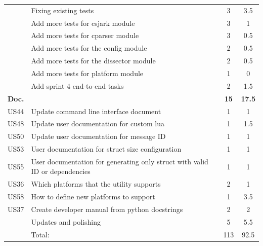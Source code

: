 \begin{table}[htbp]
\begin{tabularx}{\textwidth}{l X c c}
	 & Fixing existing tests & 3 & 3.5 \\
	 & Add more tests for csjark module & 3 & 1 \\
	 & Add more tests for cparser module & 3 & 0.5 \\
	 & Add more tests for the config module & 2 & 0.5 \\
	 & Add more tests for the dissector module & 2 & 0.5 \\
	 & Add more tests for platform module & 1 & 0 \\
	 & Add sprint 4 end-to-end tasks & 2 & 1.5 \\
	\addlinespace
	\textbf{Doc.} &  & \textbf{15} & \textbf{17.5} \\
	US44 & Update command line interface document & 1 & 1 \\
	US48 & Update user documentation for custom \Gls{lua} & 1 & 1.5 \\
	US50 & Update user documentation for message ID & 1 & 1 \\
	US53 & User documentation for \gls{struct} size configuration & 1 & 1 \\
	US55 & User documentation for generating only \gls{struct} with valid ID or dependencies & 1 & 1 \\
	US36 & Which platforms that the \gls{utility} supports & 2 & 1 \\
	US58 & How to define new platforms to support & 1 & 3.5 \\
	US37 & Create developer manual from python docstrings & 2 & 2 \\
	& Updates and polishing & 5 & 5.5 \\
	\midrule
	& Total: & 113 & 92.5 \\
	\bottomrule
\end{tabularx}
\end{table}

